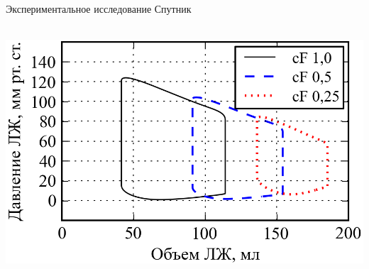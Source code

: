\documentclass[a4paper, 9pt]{beamer}
\begin{document}
\begin{frame}{Экспериментальное исследование Спутник}
\begin{minipage}[ht]{0.49\textwidth}
\vskip-5pt
{~~~~~~~~~~~~~~~~~~\centering\includegraphics[scale=0.35]{../images/mcl_cF_pres}}

\end{minipage}
\hfill
\begin{minipage}[ht]{0.49\textwidth}
\scriptsize


\end{minipage}
\end{frame}
\end{document}
